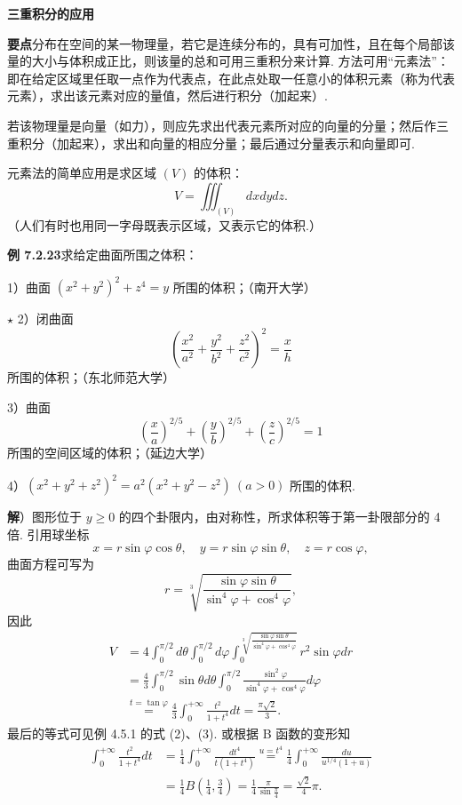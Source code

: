 \documentclass[UTF8,12pt,a4paper,fontset=fandol]{ctexart}
\begin{document}
\noindent\textbf{三重积分的应用}

\noindent\textbf{要点}\quad 分布在空间的某一物理量，若它是连续分布的，具有可加性，且在每个局部该量的大小与体积成正比，则该量的总和可用三重积分来计算. 方法可用“元素法”：即在给定区域里任取一点作为代表点，在此点处取一任意小的体积元素（称为代表元素），求出该元素对应的量值，然后进行积分（加起来）.

若该物理量是向量（如力），则应先求出代表元素所对应的向量的分量；然后作三重积分（加起来），求出和向量的相应分量；最后通过分量表示和向量即可.

元素法的简单应用是求区域 $(V)$ 的体积：
\[
V=\iiint_{(V)}dxdydz.
\]
（人们有时也用同一字母既表示区域，又表示它的体积.）

\noindent\textbf{例 7.2.23}\quad 求给定曲面所围之体积：

1）曲面 $(x^2+y^2)^2+z^4=y$ 所围的体积；（南开大学）

$\star$ 2）闭曲面
\[
\left(\frac{x^2}{a^2}+\frac{y^2}{b^2}+\frac{z^2}{c^2}\right)^2=\frac xh
\]
所围的体积；（东北师范大学）

3）曲面
\[
\left(\frac xa\right)^{2/5}+\left(\frac yb\right)^{2/5}
+\left(\frac zc\right)^{2/5}=1
\]
所围的空间区域的体积；（延边大学）

4）$(x^2+y^2+z^2)^2=a^2(x^2+y^2-z^2)\ (a>0)$ 所围的体积.

\noindent\textbf{解}）图形位于 $y\ge0$ 的四个卦限内，由对称性，所求体积等于第一卦限部分的 4 倍. 引用球坐标
\[
x=r\sin\varphi\cos\theta,\quad y=r\sin\varphi\sin\theta,\quad z=r\cos\varphi,
\]
曲面方程可写为
\[
r=\sqrt[3]{\frac{\sin\varphi\sin\theta}{\sin^4\varphi+\cos^4\varphi}},
\]
因此
\[
\begin{aligned}
V&=4\int_0^{\pi/2}d\theta\int_0^{\pi/2}d\varphi
\int_0^{\sqrt[3]{\frac{\sin\varphi\sin\theta}{\sin^4\varphi+\cos^4\varphi}}}
r^2\sin\varphi dr\\
&=\frac43\int_0^{\pi/2}\sin\theta d\theta
\int_0^{\pi/2}\frac{\sin^2\varphi}{\sin^4\varphi+\cos^4\varphi}d\varphi\\
&\stackrel{t=\tan\varphi}=
\frac43\int_0^{+\infty}\frac{t^2}{1+t^4}dt
=\frac{\pi\sqrt2}3.
\end{aligned}
\]
最后的等式可见例 4.5.1 的式 (2)、(3). 或根据 B 函数的变形知
\[
\begin{aligned}
\int_0^{+\infty}\frac{t^2}{1+t^4}dt
&=\frac14\int_0^{+\infty}\frac{dt^4}{t(1+t^4)}
\stackrel{u=t^4}=\frac14\int_0^{+\infty}\frac{du}{u^{1/4}(1+u)}\\
&=\frac14B\left(\frac14,\frac34\right)
=\frac14\frac\pi{\sin\frac\pi4}
=\frac{\sqrt2}4\pi.
\end{aligned}
\]
\end{document}
